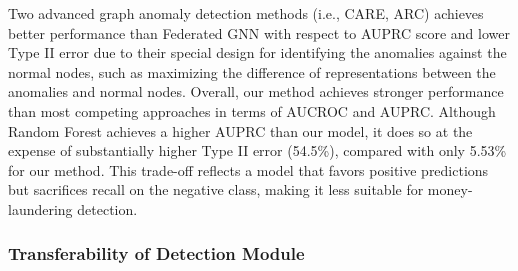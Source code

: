 \documentclass[11pt,english]{article}
\begin{document}
Two advanced graph anomaly detection methods (i.e., CARE, ARC) achieves better performance than Federated GNN with respect to AUPRC score and lower Type II error due to their special design for identifying the anomalies against the normal nodes, such as maximizing the difference of representations between the anomalies and normal nodes. Overall, our method achieves stronger performance than most competing approaches in terms of AUCROC and AUPRC. Although Random Forest achieves a higher AUPRC than our model, it does so at the expense of substantially higher Type II error (54.5\%), compared with only 5.53\% for our method. This trade-off reflects a model that favors positive predictions but sacrifices recall on the negative class, making it less suitable for money-laundering detection.




\subsubsection{Transferability of Detection Module}
\end{document}

